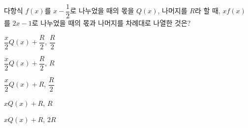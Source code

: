 다항식 $f(x)$를 $x-\dfrac{1}{2}$로 나누었을 때의 몫을 $Q(x)$, 나머지를 $R$라 할 때, $xf(x)$를 $2x-1$로 나누었을 때의 몫과 나머지를 차례대로 나열한 것은?
\begin{choicesii}{\rule[-3ex]{0pt}{8ex}$\dfrac{x}{2}Q(x)+\dfrac{R}{2}$, $\dfrac{R}{2}$}{\rule[-3ex]{0pt}{8ex}$\dfrac{x}{2}Q(x)+\dfrac{R}{2}$, $R$}{\rule[-3ex]{0pt}{8ex}$\dfrac{x}{2}Q(x)+R$, $\dfrac{R}{2}$}{\rule[-3ex]{0pt}{8ex}$xQ(x)+R$, $R$}{\rule[-3ex]{0pt}{8ex}$xQ(x)+R$, $2R$}\end{choicesii}

